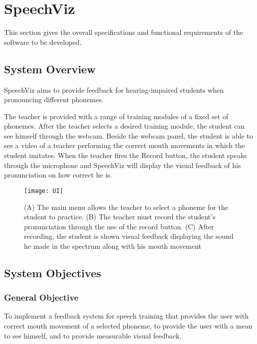 %
%
%                 

\chapter{SpeechViz}
This section gives the overall specifications and functional requirements of the software to be developed.

\section{System Overview}
SpeechViz aims to provide feedback for hearing-impaired students when pronouncing different phonemes.

The teacher is provided with a range of training modules of a fixed set of phonemes.  After the teacher selects a desired training module, the student can see himself through the webcam. Beside the webcam panel, the student is able to see a video of a teacher performing the correct mouth movements in which the student imitates. When the teacher fires the Record button, the student speaks through the microphone and SpeechViz will display the visual feedback of his pronunciation on how correct he is.

\begin{figure}[!htbp]
    \centering
    \texttt{[image: UI]}
    \caption{(A) The main menu allows the teacher to select a phoneme for the student to practice. (B) The teacher must record the student's pronunciation through the use of the record button. (C) After recording, the student is shown visual feedback displaying the sound he made in the spectrum along with his mouth movement}
    \label{fig:proto-mainmenu}
\end{figure}


\pagebreak

\section{System Objectives}

\subsection{General Objective}
To implement a feedback system for speech training that provides the user with correct mouth movement of a selected phoneme, to provide the user with a mean to see himself, and to provide measurable visual feedback.

